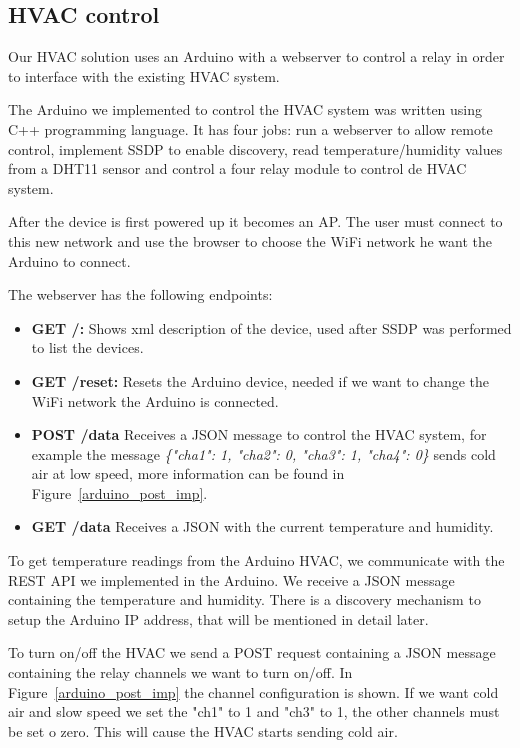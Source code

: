 \subsection{HVAC control}

Our HVAC solution uses an Arduino with a webserver to control a relay in order to interface with the existing HVAC system.

The Arduino we implemented to control the HVAC system was written using C++ programming language. It has four jobs: run a webserver to allow remote control, implement \ac{SSDP} to enable discovery, read temperature/humidity values from a DHT11 sensor and control a four relay module to control de HVAC system.

After the device is first powered up it becomes an \ac{AP}. The user must connect to this new network and use the browser to choose the \ac{WiFi} network he want the Arduino to connect.


The webserver has the following endpoints:


\begin{itemize}
  \item \textbf{GET /:} Shows xml description of the device, used after \ac{SSDP} was performed to list the devices.
  \item \textbf{GET /reset:} Resets the Arduino device, needed if we want to change the WiFi network the Arduino is connected.
  \item \textbf{POST /data} Receives a JSON message to control the HVAC system, for example the message \textit{\{"cha1": 1, "cha2": 0, "cha3": 1, "cha4": 0\}} sends cold air at low speed, more information can be found in Figure~\ref{arduino_post_imp}.
  
  \item \textbf{GET /data} Receives a JSON with the current temperature and humidity.
 
\end{itemize}


To get temperature readings from the Arduino \ac{HVAC}, we communicate with the \ac{REST} \ac{API} we implemented in the Arduino. We receive a \ac{JSON} message containing the temperature and humidity. There is a discovery mechanism to setup the Arduino IP address, that will be mentioned in detail later.

To turn on/off the \ac{HVAC} we send a POST request containing a \ac{JSON} message containing the relay channels we want to turn on/off. In Figure~\ref{arduino_post_imp} the channel configuration is shown. If we want cold air   and slow speed we set the "ch1" to 1 and "ch3" to 1, the other channels must be set o zero. This will cause the \ac{HVAC} starts sending cold air.


